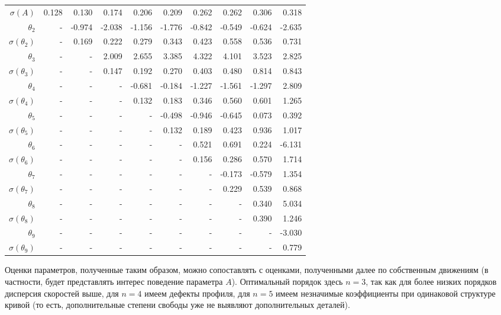 \documentclass{matmex-diploma-custom}
\begin{document}
\begin{table}[h!!]
\begin{tabular}{r|rr|r|rrrrrr}
 $\sigma(A) $ & 0.128     &    0.130 &   0.174 &   0.206 &   0.209 &   0.262 &   0.262 &   0.306 &   0.318  \\
 $\theta_2$&-        &  -0.974 &  -2.038 &  -1.156 &  -1.776 &  -0.842 &  -0.549 &  -0.624 &  -2.635  \\
 $\sigma(\theta_2)$&-      &   0.169 &   0.222 &   0.279 &   0.343 &   0.423 &   0.558 &   0.536 &   0.731  \\
 $\theta_3$&-      &    - &   2.009 &   2.655 &   3.385 &   4.322 &   4.101 &   3.523 &   2.825  \\
 $\sigma(\theta_3)$&-      &    - &   0.147 &   0.192 &   0.270 &   0.403 &   0.480 &   0.814 &   0.843  \\
 $\theta_4$&-      &    - &    - &  -0.681 &  -0.184 &  -1.227 &  -1.561 &  -1.297 &   2.809  \\
 $\sigma(\theta_4)$&-      &    - &    - &   0.132 &   0.183 &   0.346 &   0.560 &   0.601 &   1.265  \\
 $\theta_5$&-      &    - &    - &    - &  -0.498 &  -0.946 &  -0.645 &   0.073 &   0.392  \\
 $\sigma(\theta_5)$&-      &    - &    - &    - &   0.132 &   0.189 &   0.423 &   0.936 &   1.017  \\
 $\theta_6$&-      &    - &    - &    - &    - &   0.521 &   0.691 &   0.224 &  -6.131  \\
 $\sigma(\theta_6)$&-    &    - &    - &    - &    - &   0.156 &   0.286 &   0.570 &   1.714  \\
 $\theta_7$&-     &    - &    - &    - &    - &    - &  -0.173 &  -0.579 &   1.354  \\
 $ \sigma(\theta_7)$&-     &    - &    - &    - &    - &    - &   0.229 &   0.539 &   0.868  \\
 $\theta_8$&-     &    - &    - &    - &    - &    - &    - &   0.340 &   5.034  \\
 $ \sigma(\theta_8)$&-     &    - &    - &    - &    - &    - &    - &   0.390 &   1.246  \\
 $\theta_9$&-     &    - &    - &    - &    - &    - &    - &    - &  -3.030  \\
 $ \sigma(\theta_9)$&-     &    - &    - &    - &    - &    - &    - &    - &   0.779  \\

\end{tabular}
\end{table}

Оценки параметров, полученные таким образом, можно сопоставлять с оценками, полученными далее по собственным движениям (в частности, будет представлять интерес поведение параметра $A$). Оптимальный порядок здесь $n = 3$, так как для более низких порядков дисперсия скоростей выше, для $n = 4$ имеем дефекты профиля, для $n = 5$ имеем незначимые коэффициенты при одинаковой структуре кривой (то есть, дополнительные степени свободы уже не выявляют дополнительных деталей).
\pagebreak
\end{document}
